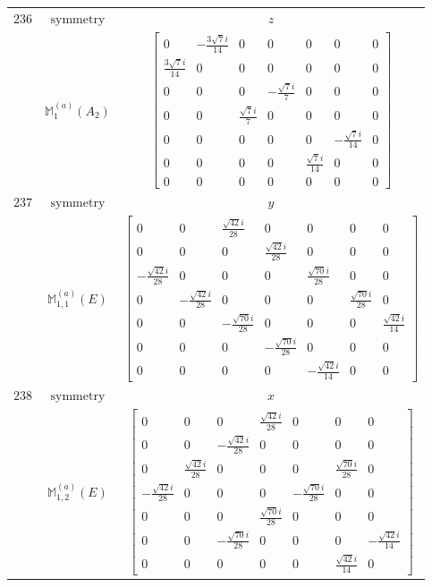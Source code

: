 \documentclass[fleqn,8pt,landscape]{jsarticle}
\begin{document}
\begin{longtable}{ccc}
$ 236 $ & $ \text{symmetry} $ & $ z $ \\
$  $ & $ \mathbb{M}_{1}^{(a)}(A_{2}) $ & $ \begin{bmatrix} 0 & - \frac{3 \sqrt{7} i}{14} & 0 & 0 & 0 & 0 & 0 \\ \frac{3 \sqrt{7} i}{14} & 0 & 0 & 0 & 0 & 0 & 0 \\ 0 & 0 & 0 & - \frac{\sqrt{7} i}{7} & 0 & 0 & 0 \\ 0 & 0 & \frac{\sqrt{7} i}{7} & 0 & 0 & 0 & 0 \\ 0 & 0 & 0 & 0 & 0 & - \frac{\sqrt{7} i}{14} & 0 \\ 0 & 0 & 0 & 0 & \frac{\sqrt{7} i}{14} & 0 & 0 \\ 0 & 0 & 0 & 0 & 0 & 0 & 0 \end{bmatrix} $ \\ \hline
$ 237 $ & $ \text{symmetry} $ & $ y $ \\
$  $ & $ \mathbb{M}_{1,1}^{(a)}(E) $ & $ \begin{bmatrix} 0 & 0 & \frac{\sqrt{42} i}{28} & 0 & 0 & 0 & 0 \\ 0 & 0 & 0 & \frac{\sqrt{42} i}{28} & 0 & 0 & 0 \\ - \frac{\sqrt{42} i}{28} & 0 & 0 & 0 & \frac{\sqrt{70} i}{28} & 0 & 0 \\ 0 & - \frac{\sqrt{42} i}{28} & 0 & 0 & 0 & \frac{\sqrt{70} i}{28} & 0 \\ 0 & 0 & - \frac{\sqrt{70} i}{28} & 0 & 0 & 0 & \frac{\sqrt{42} i}{14} \\ 0 & 0 & 0 & - \frac{\sqrt{70} i}{28} & 0 & 0 & 0 \\ 0 & 0 & 0 & 0 & - \frac{\sqrt{42} i}{14} & 0 & 0 \end{bmatrix} $ \\ \hline
$ 238 $ & $ \text{symmetry} $ & $ x $ \\
$  $ & $ \mathbb{M}_{1,2}^{(a)}(E) $ & $ \begin{bmatrix} 0 & 0 & 0 & \frac{\sqrt{42} i}{28} & 0 & 0 & 0 \\ 0 & 0 & - \frac{\sqrt{42} i}{28} & 0 & 0 & 0 & 0 \\ 0 & \frac{\sqrt{42} i}{28} & 0 & 0 & 0 & \frac{\sqrt{70} i}{28} & 0 \\ - \frac{\sqrt{42} i}{28} & 0 & 0 & 0 & - \frac{\sqrt{70} i}{28} & 0 & 0 \\ 0 & 0 & 0 & \frac{\sqrt{70} i}{28} & 0 & 0 & 0 \\ 0 & 0 & - \frac{\sqrt{70} i}{28} & 0 & 0 & 0 & - \frac{\sqrt{42} i}{14} \\ 0 & 0 & 0 & 0 & 0 & \frac{\sqrt{42} i}{14} & 0 \end{bmatrix} $ \\ \hline

\end{longtable}
\end{document}
